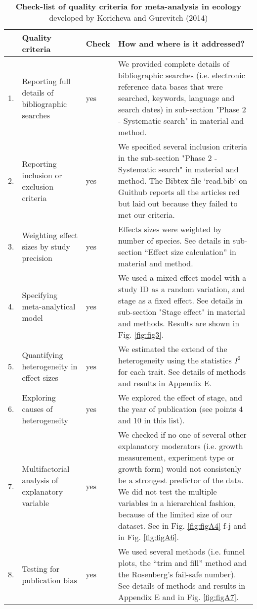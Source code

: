 \documentclass[a4paper,11pt]{article}
\begin{document}
\clearpage
\begin{table}[h!]
\centering
\caption{\textbf{Check-list of quality criteria for meta-analysis in ecology} developed by Koricheva and Gurevitch (2014) }
{\footnotesize
\vspace{0.5cm}
\begin{tabular}{p{0.2cm}p{4cm}p{0.8cm}p{7cm}}
  \hline
  & Quality criteria & Check & How and where is it addressed? \\
  \hline
  1.& Reporting full details of bibliographic searches & yes	& We provided complete details of bibliographic searches (i.e. electronic reference data bases that were searched, keywords, language and search dates) in sub-section "Phase 2 - Systematic search" in material and method.\\
  2.& Reporting inclusion or exclusion criteria & yes & We specified several inclusion criteria in the sub-section "Phase 2 - Systematic search" in material and method. The Bibtex file `read.bib` on Guithub reports all the articles red but laid out because they failed to met our criteria.\\
  3.& Weighting effect sizes by study precision & yes & Effects sizes were weighted by number of species. See	 details in sub-section ``Effect size calculation'' in material and method.\\
 4.& Specifying meta-analytical model &	yes	& We used a mixed-effect model with a study ID as a random variation, and stage as a fixed effect. See details in sub-section "Stage effect" in material and methods. Results are shown in Fig. \ref{fig:fig3}.\\
 5.& Quantifying heterogeneity in effect sizes &	yes &	We estimated the extend of the heterogeneity using the statistics $I^{2}$ for each trait. See details of methods and results in Appendix E.\\
 6.& Exploring causes of heterogeneity & yes &	We explored the effect of stage, and the year of publication (see points 4 and 10 in this list). \\
 7.& Multifactorial analysis of explanatory variable	& yes & We checked if no one of several other explanatory moderators (i.e. growth measurement, experiment type or growth form) would not consistenly be a strongest predictor of the data. We did not test the multiple variables in a hierarchical fashion, because of the limited size of our dataset. See in Fig. \ref{fig:figA4} f-j and in Fig. \ref{fig:figA6}.\\
  8.& Testing for publication bias &	yes	& We used several methods (i.e. funnel plots, the ``trim and fill'' method and the Rosenberg’s fail-safe number). See details of methods and results in Appendix E and in Fig. \ref{fig:figA7}.\\

\end{tabular}}
\end{table}
\end{document}
